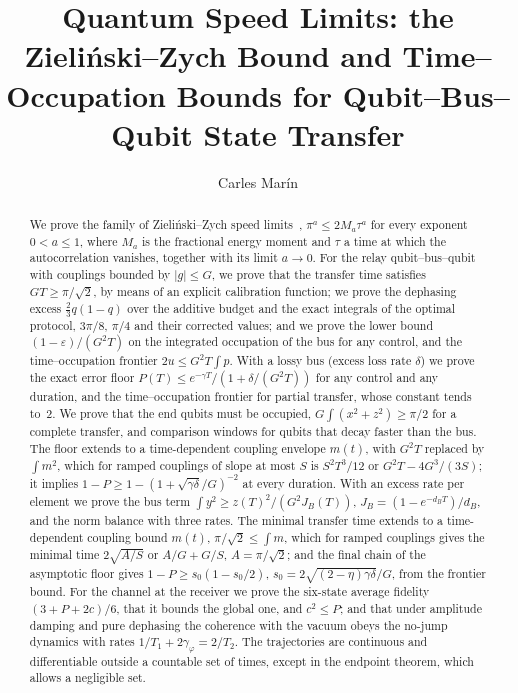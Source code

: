 \documentclass[10pt,a4paper]{article}
\begin{document}
\title{Quantum Speed Limits: the Zieli\'nski--Zych Bound and Time--Occupation Bounds for Qubit--Bus--Qubit State Transfer}
\author{Carles Mar\'in}
\maketitle

\begin{abstract}
We prove the family of Zieli\'nski--Zych speed limits~\cite{ZZ06}, $\pi^a\le 2M_a\tau^a$ for every exponent
$0<a\le 1$, where $M_a$ is the fractional energy moment and $\tau$ a time at which the autocorrelation vanishes,
together with its limit $a\to 0$. For the relay qubit--bus--qubit with couplings bounded by $|g|\le G$, we prove that
the transfer time satisfies $GT\ge\pi/\sqrt2$, by means of an explicit calibration function; we prove the dephasing
excess $\tfrac23 q(1-q)$ over the additive budget and the exact integrals of the optimal protocol, $3\pi/8$,
$\pi/4$ and their corrected values; and we prove the lower bound $(1-\varepsilon)/(G^2T)$ on the integrated
occupation of the bus for any control, and the time--occupation frontier $2u\le G^2T\int p$. With a lossy bus
(excess loss rate $\delta$) we prove the exact error floor $P(T)\le e^{-\gamma T}/(1+\delta/(G^2T))$ for any
control and any duration, and the time--occupation frontier for partial transfer, whose constant tends to~2. We
prove that the end qubits must be occupied, $G\int(x^2+z^2)\ge\pi/2$ for a complete transfer, and comparison
windows for qubits that decay faster than the bus. The floor extends to a time-dependent coupling envelope
$m(t)$, with $G^2T$ replaced by $\int m^2$, which for ramped couplings of slope at most $S$ is
$S^2T^3/12$ or $G^2T-4G^3/(3S)$; it implies $1-P\ge1-(1+\sqrt{\gamma\delta}/G)^{-2}$ at every duration. With an
excess rate per element we prove the bus term $\int y^2\ge z(T)^2/(G^2J_B(T))$, $J_B=(1-e^{-d_BT})/d_B$, and
the norm balance with three rates. The minimal transfer time extends to a time-dependent coupling bound $m(t)$, $\pi/\sqrt2\le\int m$, which
for ramped couplings gives the minimal time $2\sqrt{A/S}$ or $A/G+G/S$, $A=\pi/\sqrt2$; and the final chain of
the asymptotic floor gives $1-P\ge s_0(1-s_0/2)$, $s_0=2\sqrt{(2-\eta)\gamma\delta}/G$, from the frontier bound. For the channel at the receiver we prove the six-state average fidelity $(3+P+2c)/6$, that it bounds the
global one, and $c^2\le P$; and that under amplitude damping and pure dephasing the coherence with the vacuum
obeys the no-jump dynamics with rates $1/T_1+2\gamma_\varphi=2/T_2$. The trajectories
are continuous and differentiable outside a countable set of times, except in the endpoint theorem, which
allows a negligible set.
\end{abstract}
\end{document}
